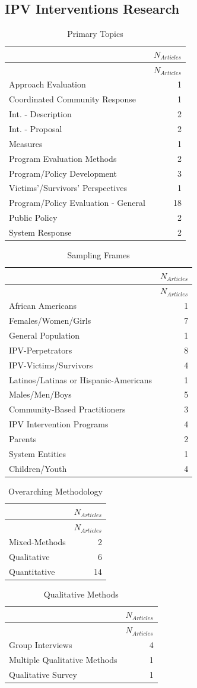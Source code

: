 \documentclass[]{tufte-handout}
\begin{document}
\subsection{IPV Interventions
Research}\label{ipv-interventions-research}

\begin{longtable}[]{@{}lr@{}}
\caption{Primary Topics}\tabularnewline
\toprule
& \(N_{Articles}\)\tabularnewline
\midrule
\endfirsthead
\toprule
& \(N_{Articles}\)\tabularnewline
\midrule
\endhead
Approach Evaluation & 1\tabularnewline
Coordinated Community Response & 1\tabularnewline
Int. - Description & 2\tabularnewline
Int. - Proposal & 2\tabularnewline
Measures & 1\tabularnewline
Program Evaluation Methods & 2\tabularnewline
Program/Policy Development & 3\tabularnewline
Victims'/Survivors' Perspectives & 1\tabularnewline
Program/Policy Evaluation - General & 18\tabularnewline
Public Policy & 2\tabularnewline
System Response & 2\tabularnewline
\bottomrule
\end{longtable}

\begin{longtable}[]{@{}lr@{}}
\caption{Sampling Frames}\tabularnewline
\toprule
& \(N_{Articles}\)\tabularnewline
\midrule
\endfirsthead
\toprule
& \(N_{Articles}\)\tabularnewline
\midrule
\endhead
African Americans & 1\tabularnewline
Females/Women/Girls & 7\tabularnewline
General Population & 1\tabularnewline
IPV-Perpetrators & 8\tabularnewline
IPV-Victims/Survivors & 4\tabularnewline
Latinos/Latinas or Hispanic-Americans & 1\tabularnewline
Males/Men/Boys & 5\tabularnewline
Community-Based Practitioners & 3\tabularnewline
IPV Intervention Programs & 4\tabularnewline
Parents & 2\tabularnewline
System Entities & 1\tabularnewline
Children/Youth & 4\tabularnewline
\bottomrule
\end{longtable}

\begin{longtable}[]{@{}lr@{}}
\caption{Overarching Methodology}\tabularnewline
\toprule
& \(N_{Articles}\)\tabularnewline
\midrule
\endfirsthead
\toprule
& \(N_{Articles}\)\tabularnewline
\midrule
\endhead
Mixed-Methods & 2\tabularnewline
Qualitative & 6\tabularnewline
Quantitative & 14\tabularnewline
\bottomrule
\end{longtable}

\begin{longtable}[]{@{}lr@{}}
\caption{Qualitative Methods}\tabularnewline
\toprule
& \(N_{Articles}\)\tabularnewline
\midrule
\endfirsthead
\toprule
& \(N_{Articles}\)\tabularnewline
\midrule
\endhead
Group Interviews & 4\tabularnewline
Multiple Qualitative Methods & 1\tabularnewline
Qualitative Survey & 1\tabularnewline
\bottomrule
\end{longtable}
\end{document}
